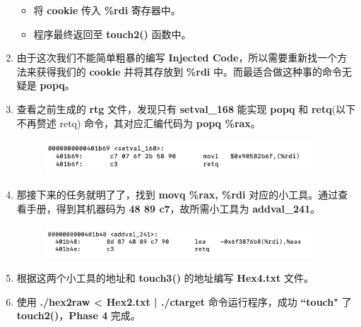 \begin{enumerate}
                \begin{itemize}
                    \item 将 \textbf{cookie} 传入 \textbf{\%rdi} 寄存器中。
                    \item 程序最终返回至 \textbf{touch2()} 函数中。
                \end{itemize}    
            \item 由于这次我们不能简单粗暴的编写 \textbf{Injected Code}，所以需要重新找一个方法来获得我们的 \textbf{cookie} 并将其存放到 \textbf{\%rdi} 中。而最适合做这种事的命令无疑是 \textbf{popq}。
            \item 查看之前生成的 \textbf{rtg} 文件，发现只有 \textbf{setval_168} 能实现 \textbf{popq} 和 \textbf{retq}(以下不再赘述 retq) 命令，其对应汇编代码为 \textbf{popq \%rax}。
                \begin{figure}[htbp]
                    \includegraphics*[width = 10cm]{s4_0.png}
                \end{figure}
            \item 那接下来的任务就明了了，找到 \textbf{movq \%rax, \%rdi} 对应的小工具。通过查看手册，得到其机器码为 \textbf{48 89 c7}，故所需小工具为 \textbf{addval_241}。
                \begin{figure}[htbp]
                    \includegraphics*[width = 10cm]{s4_1.png}
                \end{figure}
            \item 根据这两个小工具的地址和 \textbf{touch3()} 的地址编写 \textbf{Hex4.txt} 文件。
                
            \item 使用 \textbf{./hex2raw < Hex2.txt | ./ctarget} 命令运行程序，成功 \textbf{``touch"} 了 \textbf{touch2()}，\textbf{Phase 4} 完成。   
        \end{enumerate}
        

    